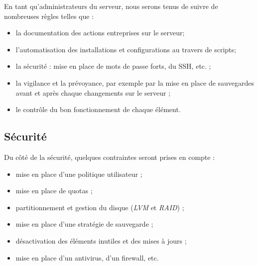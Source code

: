 En tant qu'administrateurs du serveur, nous serons tenus de suivre de nombreuses
règles telles que :
\begin{itemize}
\item la documentation des actions entreprises sur le serveur;
\item l'automatisation des installations et configurations au travers de scripts;
\item la sécurité : mise en place de mots de passe forts, du SSH, etc. ;
\item la vigilance et la prévoyance, par exemple par la mise en place de
  sauvegardes avant et après chaque changements sur le serveur ;
\item le contrôle du bon fonctionnement de chaque élément.
\end{itemize}

\subsection{Sécurité}
\label{subsec:securite}

Du côté de la sécurité, quelques contraintes seront prises en compte :
\begin{itemize}
\item mise en place d'une politique utilisateur ;
\item mise en place de quotas ;
\item partitionnement et gestion du disque (\emph{LVM} et
  \emph{RAID}) ;
\item mise en place d'une stratégie de sauvegarde ;
\item désactivation des éléments inutiles et des mises à jours ;
\item mise en place d'un antivirus, d'un firewall, etc.
\end{itemize}

